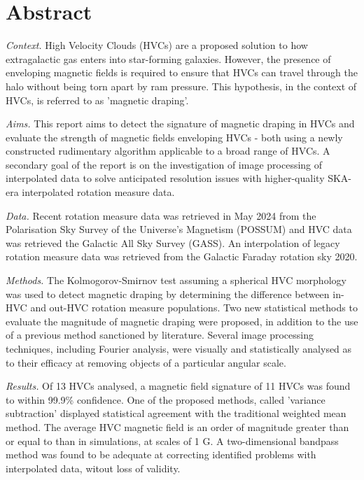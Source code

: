 \chapter*{Abstract}

\noindent\textit{Context.} High Velocity Clouds (HVCs) are a proposed solution to how extragalactic gas enters into star-forming galaxies. However, the presence of enveloping magnetic fields is required to ensure that HVCs can travel through the halo without being torn apart by ram pressure. This hypothesis, in the context of HVCs, is referred to as 'magnetic draping'.

\noindent\textit{Aims.} This report aims to detect the signature of magnetic draping in HVCs and evaluate the strength of magnetic fields enveloping HVCs - both using a newly constructed rudimentary algorithm applicable to a broad range of HVCs. A secondary goal of the report is on the investigation of image processing of interpolated data to solve anticipated resolution issues with higher-quality SKA-era interpolated rotation measure data.

\noindent\textit{Data.} Recent rotation measure data was retrieved in May 2024 from the Polarisation Sky Survey of the Universe's Magnetism (POSSUM) and HVC data was retrieved the Galactic All Sky Survey (GASS). An interpolation of legacy rotation measure data was retrieved from the Galactic Faraday rotation sky 2020.

\noindent\textit{Methods.} The Kolmogorov-Smirnov test assuming a spherical HVC morphology was used to detect magnetic draping by determining the difference between in-HVC and out-HVC rotation measure populations. Two new statistical methods to evaluate the magnitude of magnetic draping were proposed, in addition to the use of a previous method sanctioned by literature. Several image processing techniques, including Fourier analysis, were visually and statistically analysed as to their efficacy at removing objects of a particular angular scale.

\noindent\textit{Results.} Of 13 HVCs analysed, a magnetic field signature of 11 HVCs was found to within 99.9\% confidence. One of the proposed methods, called 'variance subtraction' displayed statistical agreement with the traditional weighted mean method. The average HVC magnetic field is an order of magnitude greater than or equal to than in simulations, at scales of 1 \textmu G. A two-dimensional bandpass method was found to be adequate at correcting identified problems with interpolated data, witout loss of validity.


